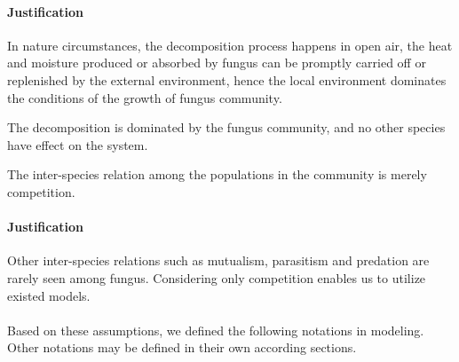 \paragraph{Justification} In nature circumstances, the decomposition process happens in open air, the heat and moisture produced or absorbed by fungus can be promptly carried off or replenished  by the external environment, hence the local environment dominates the conditions of the growth of fungus community.

\begin{definition}
The decomposition is dominated by the fungus community, and no other species have effect on the system.
\end{definition}

\begin{definition} The inter-species relation among the populations in the community is merely competition.
\end{definition}

\paragraph{Justification} Other inter-species relations such as mutualism, parasitism and predation are rarely seen among fungus. Considering only competition enables us to utilize existed models.

\paragraph{}
Based on these assumptions, we defined the following notations in modeling. Other notations may be defined in their own according sections.


